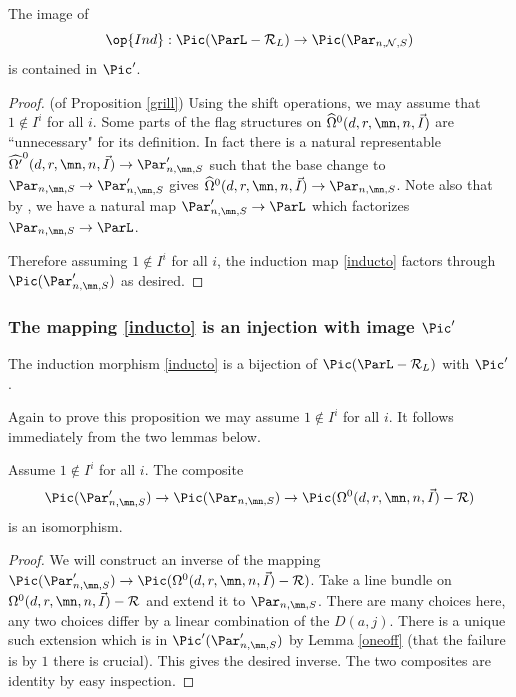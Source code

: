 \begin{proposition}
\notready\label{grill}
The image of
$$\op{Ind}:\Pic(\ParL -\mathcal{R}_L)\to \Pic(\Par_{n,\mathcal{N},S})$$
 is contained in  $\Pic'$.
\end{proposition}
\begin{proof}(of Proposition \ref{grill})
Using the shift operations, we may assume that $1\not\in I^i$ for all $i$.
Some parts of the flag structures on $\widehat{\Omega}^0(d,r,\mn,n,\vec{I})$ are ``unnecessary" for its definition. In fact there is a natural  representable $\widehat{\Omega'}^0(d,r,\mn,n,\vec{I})\to \Par'_{n,\mn,S}$ such that the base change to $\Par_{n,\mn,S}\to\Par'_{n,\mn,S}$ gives $\widehat{\Omega}^0(d,r,\mn,n,\vec{I})\to \Par_{n,\mn,S}$. Note also that by \cite[Lemma 7.10]{BHermit}, we have a natural map $\Par'_{n,\mn,S}\to \ParL$ which factorizes $\Par_{n,\mn,S}\to \ParL$.

Therefore assuming $1\not\in I^i$ for all $i$, the induction map \eqref{inducto} factors through  $\Pic(\Par'_{n,\mn,S})$ as desired.
\end{proof}


 \subsubsection{The mapping  \eqref{inducto} is an injection with image $\Pic'$}
\begin{proposition}
\notready\label{outside}
The induction morphism \eqref{inducto} is a bijection of $\Pic(\ParL -\mathcal{R}_L)$ with $\Pic'$.
\end{proposition}

Again to prove this proposition we may assume  $1\not\in I^i$ for all $i$. It follows immediately from the two lemmas below.

\begin{lemma}
\notready\label{later}
Assume $1\not\in I^i$ for all $i$.
The composite
$$\Pic(\Par'_{n,\mn,S})\to \Pic(\Par_{n,\mn,S})\to  \Pic({\Omega}^0(d,r,\mn,n,\vec{I})-\mathcal{R})$$ is an isomorphism.
\end{lemma}
\begin{proof}
We will construct an inverse of the mapping $\Pic(\Par'_{n,\mn,S})\to  \Pic({\Omega}^0(d,r,\mn,n,\vec{I})-\mathcal{R})$. Take a line bundle on ${\Omega}^0(d,r,\mn,n,\vec{I})-\mathcal{R}$ and extend it to $\Par_{n,\mn,S}$. There are many choices here, any two choices differ by a linear combination of the $D(a,j)$. There is a unique such extension which is in $\Pic'(\Par'_{n,\mn,S})$ by Lemma \ref{oneoff} (that the failure is by $1$  there is crucial). This gives the desired inverse. The two composites are identity by easy inspection.
\end{proof}

